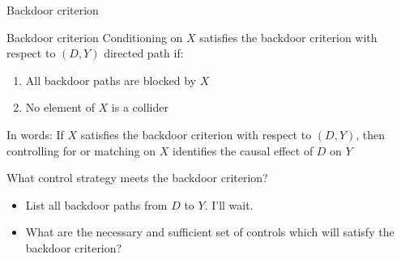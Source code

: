 \documentclass{beamer}
\begin{document}
\begin{frame}{Backdoor criterion}


  \begin{block}{Backdoor criterion}
    Conditioning on $X$ satisfies the backdoor criterion with respect to $(D,Y)$ directed path if:
    \begin{enumerate}
      \item All backdoor paths are blocked by $X$
      \item No element of $X$ is a collider
    \end{enumerate}

    In words: If $X$ satisfies the backdoor criterion with respect to $(D,Y)$, then controlling for or matching on $X$ identifies the causal effect of $D$ on $Y$
  \end{block}
\end{frame}

\begin{frame}{What control strategy meets the backdoor criterion?}
  \begin{itemize}
    \item List all backdoor paths from $D$ to $Y$. I'll wait.

          \begin{center}
          \end{center}

    \item What are the necessary and sufficient set of controls which will satisfy the backdoor criterion?
  \end{itemize}

  \framebreak




\end{frame}
\end{document}

